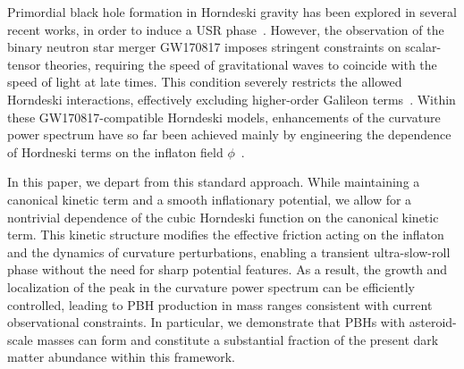 \documentclass[nofootinbib,aps,a4paper,letterpaper,superscriptaddress,
twocolumn,times]{revtex4}
\renewcommand{\(}{\left(}
\renewcommand{\)}{\right)}
\renewcommand{\(}{\left(}
\renewcommand{\)}{\right)}
\renewcommand{\[}{\left[}
\renewcommand{\]}{\right]}
\begin{document}
Primordial black hole formation in Horndeski gravity has been explored in 
several recent works, in order to induce a USR phase~\cite{Fu:2019ttf, 
Dalianis:2018frf, Lin:2020goi}. However, the observation of the binary neutron 
star merger GW170817 imposes stringent constraints on scalar-tensor theories, 
requiring the speed of gravitational waves to coincide with the speed of light 
at late times. This condition severely restricts the allowed Horndeski 
interactions, effectively excluding higher-order Galileon 
terms~\cite{TheLIGOScientific:2017qsa, Creminelli:2017sry, Ezquiaga:2017ekz}. 
Within these GW170817-compatible Horndeski models, enhancements of the 
curvature power spectrum have so far been achieved mainly by engineering the dependence of Hordneski terms on the inflaton field $\phi$~\cite{Yi:2020cut, Zhang:2021vak}. 

In this paper, we depart from this standard approach. While maintaining a 
canonical kinetic term and a smooth inflationary potential, we allow for a 
nontrivial dependence of the cubic Horndeski function on the canonical kinetic 
term. This kinetic structure modifies the effective friction acting on the 
inflaton and the dynamics of curvature perturbations, enabling a transient 
ultra-slow-roll phase without the need for sharp potential features. As a 
result, the growth and localization of the peak in the curvature power spectrum 
can be efficiently controlled, leading to PBH production in mass ranges 
consistent with current observational constraints. In particular, we 
demonstrate that PBHs with asteroid-scale masses can form and constitute a 
substantial fraction of the present dark matter abundance within this framework.
\end{document}

